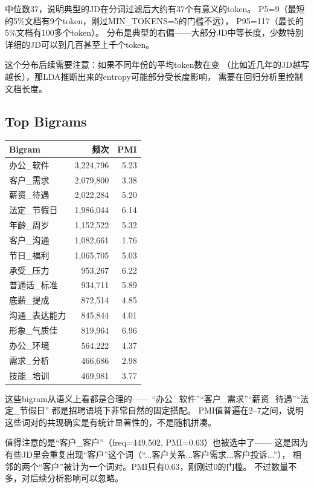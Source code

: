 \documentclass[12pt,a4paper]{ctexart}
\begin{document}
中位数37，说明典型的JD在分词过滤后大约有37个有意义的token。
P5=9（最短的5\%文档有9个token，刚过MIN\_TOKENS=5的门槛不远），
P95=117（最长的5\%文档有100多个token）。
分布是典型的右偏——大部分JD中等长度，少数特别详细的JD可以到几百甚至上千个token。

这个分布后续需要注意：如果不同年份的平均token数在变
（比如近几年的JD越写越长），那LDA推断出来的entropy可能部分受长度影响，
需要在回归分析里控制文档长度。


\subsection{Top Bigrams}

\begin{table}[h]
\centering
\small
\begin{tabular}{lrr}
\toprule
\textbf{Bigram} & \textbf{频次} & \textbf{PMI} \\
\midrule
办公\_软件 & 3,224,796 & 5.23 \\
客户\_需求 & 2,079,800 & 3.38 \\
薪资\_待遇 & 2,022,284 & 5.20 \\
法定\_节假日 & 1,986,044 & 6.14 \\
年龄\_周岁 & 1,152,522 & 5.32 \\
客户\_沟通 & 1,082,661 & 1.76 \\
节日\_福利 & 1,065,705 & 5.03 \\
承受\_压力 & 953,267 & 6.22 \\
普通话\_标准 & 934,711 & 5.89 \\
底薪\_提成 & 872,514 & 4.85 \\
沟通\_表达能力 & 845,844 & 4.01 \\
形象\_气质佳 & 819,964 & 6.96 \\
办公\_环境 & 564,222 & 4.37 \\
需求\_分析 & 466,686 & 2.98 \\
技能\_培训 & 469,981 & 3.77 \\
\bottomrule
\end{tabular}
\end{table}

这些bigram从语义上看都是合理的——
``办公\_软件''``客户\_需求''``薪资\_待遇''``法定\_节假日''
都是招聘语境下非常自然的固定搭配。
PMI值普遍在2--7之间，说明这些词对的共现确实是有统计显著性的，不是随机拼凑。

值得注意的是``客户\_客户''（freq=449,502, PMI=0.63）也被选中了——
这是因为有些JD里会重复出现``客户''这个词（``...客户关系...客户需求...客户投诉...''），
相邻的两个``客户''被计为一个词对。PMI只有0.63，刚刚过0的门槛。
不过数量不多，对后续分析影响可以忽略。
\end{document}
